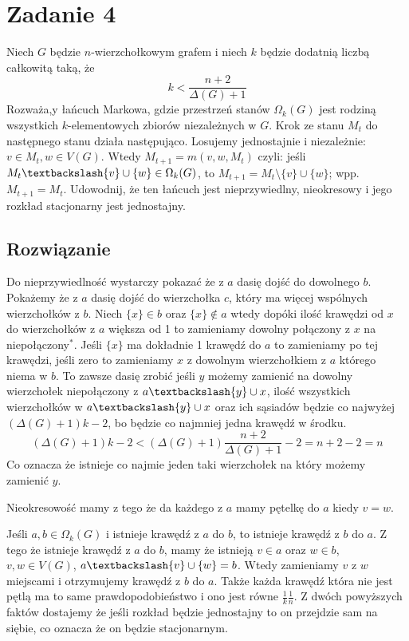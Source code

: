 \section{Zadanie 4}
Niech \(G\) będzie \(n\)-wierzchołkowym grafem i niech \(k\) będzie dodatnią liczbą całkowitą taką, że
\[k < \frac{n+2}{\Delta(G)+1}\]
Rozważa,y łańcuch Markowa, gdzie przestrzeń stanów \(\Omega_{k}(G)\) jest rodziną wszystkich \(k\)-elementowych zbiorów niezależnych w \(G\).
Krok ze stanu \(M_{t}\) do następnego stanu działa następująco.
Losujemy jednostajnie i niezależnie: \(v \in M_{t}, w \in V(G)\). Wtedy \(M_{t+1}=m(v, w, M_{t})\) czyli:
jeśli \(M_{t}\textbackslash\{v\}\cup\{w\}\in\Omega_{k}(G)\), to \(M_{t+1} = M_{t}\setminus\{v\}\cup\{w\}\); wpp. \(M_{t+1} = M_{t}\).
Udowodnij, że ten łańcuch jest nieprzywiedlny, nieokresowy i jego rozkład stacjonarny jest jednostajny.

\subsection*{Rozwiązanie}
Do nieprzywiedlność wystarczy pokazać że z \(a\) dasię dojść do dowolnego \(b\).
Pokażemy że z \(a\) dasię dojść do wierzchołka \(c\), który ma więcej wspólnych wierzchołków z \(b\).
Niech \(\{x\} \in b\) oraz \(\{x\} \notin a\) wtedy dopóki ilość krawędzi od \(x\) do wierzchołków z \(a\) większa od 1 to zamieniamy dowolny połączony z \(x\) na niepołączony\(^{*}\).
Jeśli \(\{x\}\) ma dokładnie 1 krawędź do \(a\) to zamieniamy po tej krawędzi, jeśli zero to zamieniamy \(x\) z dowolnym wierzchołkiem z \(a\) którego niema w \(b\).
To zawsze dasię zrobić jeśli \(y\) możemy zamienić na dowolny wierzchołek niepołączony z \(a\textbackslash{y}\cup{x}\),
ilość wszystkich wierzchołków w \(a\textbackslash{y}\cup{x}\) oraz ich sąsiadów będzie co najwyżej \((\Delta(G)+1)k - 2\), bo będzie co najmniej jedna krawędź w środku.
\[(\Delta(G)+1)k - 2 < (\Delta(G)+1)\frac{n+2}{\Delta(G)+1} - 2 = n + 2 - 2 = n\]
Co oznacza że istnieje co najmie jeden taki wierzchołek na który możemy zamienić \(y\).

Nieokresowość mamy z tego że da każdego z \(a\) mamy pętelkę do \(a\) kiedy \(v = w\).

Jeśli \(a, b \in \Omega_{k}(G)\) i istnieje krawędź z \(a\) do \(b\), to istnieje krawędź z \(b\) do \(a\).
Z tego że istnieje krawędź z \(a\) do \(b\), mamy że istnieją \(v \in a\) oraz \(w \in b\), \(v, w \in V(G)\), \(a\textbackslash\{v\}\cup\{w\} = b\).
Wtedy zamieniamy \(v\) z \(w\) miejscami i otrzymujemy krawędź z \(b\) do \(a\).
Także każda krawędź która nie jest pętlą ma to same prawdopodobieństwo i ono jest równe \(\frac{1}{k}\frac{1}{n}\).
Z dwóch powyższych faktów dostajemy że jeśli rozkład będzie jednostajny to on przejdzie sam na siębie, co oznacza że on będzie stacjonarnym.